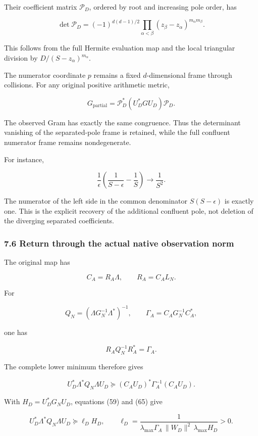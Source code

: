 \documentclass[11pt]{article}
\begin{document}
Their coefficient matrix \(\mathcal P_D\), ordered by root and increasing pole order, has

\[
\boxed{
\det\mathcal P_D
=
(-1)^{d(d-1)/2}
\prod_{\alpha<\beta}
(z_\beta-z_\alpha)^{m_\alpha m_\beta}.
}
\tag{63}
\]

This follows from the full Hermite evaluation map and the local triangular division by \(D/(S-z_\alpha)^{m_\alpha}\).

The numerator coordinate \(p\) remains a fixed \(d\)-dimensional frame through collisions. For any original positive arithmetic metric,

\[
\boxed{
G_{\mathrm{partial}}
=
\mathcal P_D^*(U_D^*GU_D)\mathcal P_D.
}
\tag{64}
\]

The observed Gram has exactly the same congruence. Thus the determinant vanishing of the separated-pole frame is retained, while the full confluent numerator frame remains nondegenerate.

For instance,

\[
\frac1\epsilon
\left(\frac1{S-\epsilon}-\frac1S\right)
\longrightarrow\frac1{S^2}.
\]

The numerator of the left side in the common denominator \(S(S-\epsilon)\) is exactly one. This is the explicit recovery of the additional confluent pole, not deletion of the diverging separated coefficients.

\subsubsection{7.6 Return through the actual native observation norm}\label{return-through-the-actual-native-observation-norm}

The original map has

\[
C_A=R_A\Lambda,
\qquad
R_A=C_AL_N.
\]

For

\[
Q_N=(\Lambda G_N^{-1}\Lambda^*)^{-1},
\qquad
\Gamma_A=C_AG_N^{-1}C_A^*,
\]

one has

\[
R_AQ_N^{-1}R_A^*=\Gamma_A.
\]

The complete lower minimum therefore gives

\[
\boxed{
U_D^*\Lambda^*Q_N\Lambda U_D
\succeq
(C_AU_D)^*\Gamma_A^{-1}(C_AU_D).
}
\tag{65}
\]

With \(H_D=U_D^*G_NU_D\), equations (59) and (65) give

\[
\boxed{
U_D^*\Lambda^*Q_N\Lambda U_D
\succeq
\ell_D H_D,
\qquad
\ell_D=
\frac1{
\lambda_{\max}\Gamma_A\,
\|W_D\|^2\,
\lambda_{\max}H_D
}>0.
}
\tag{66}
\]
\end{document}
